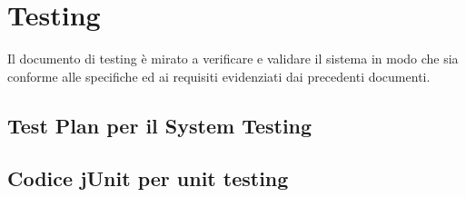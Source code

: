 %
%	 
%

\chapter{Testing}

Il documento di testing è mirato a verificare e validare il sistema in modo che sia 
conforme alle specifiche ed ai requisiti evidenziati dai precedenti documenti.

\section{Test Plan per il System Testing}



\section{Codice jUnit per unit testing}
